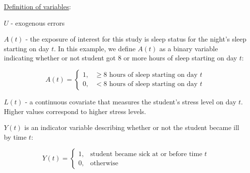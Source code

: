 \documentclass{exam}
\newenvironment{packed_item}{
\begin{itemize}
 \setlength{\itemsep}{0pt}
  \setlength{\parskip}{0pt}
  \setlength{\parsep}{0pt}
}{\end{itemize}}
\begin{document}
\underline{Definition of variables}:
\begin{packed_item}
\item[] $U$ - exogenous errors
\item[] $A(t)$ - the exposure of interest for this study is sleep status for the night's sleep starting on day $t$. In this example, we define $A(t)$ as a binary variable indicating whether or not student got 8 or more hours of sleep starting on day $t$:

  \begin{equation*}
    A(t)=
    \begin{cases}
      1, & \geq 8 \text{ hours of sleep starting on day $t$}\ \\
      0, & < 8 \text{ hours of sleep starting on day $t$}
    \end{cases}
  \end{equation*}
  
\item[] $L(t)$ - a continuous covariate that measures the student's stress level on day $t$. Higher values correspond to higher stress levels.
\item[] $Y(t)$ is an indicator variable describing whether or not the student became ill by time $t$:

  \begin{equation*}
    Y(t)=
    \begin{cases}
      1, & \text{student became sick at or before time $t$} \\
      0, & \text{otherwise}
    \end{cases}
  \end{equation*}
\end{packed_item}
\end{document}
